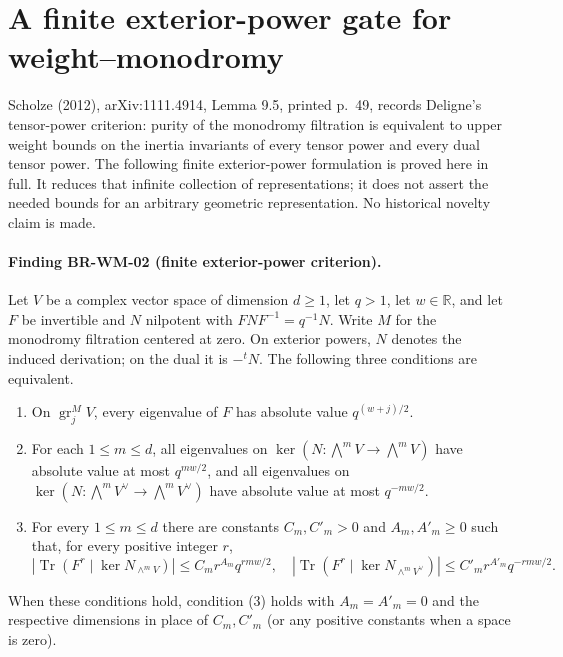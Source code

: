 \section{A finite exterior-power gate for weight--monodromy}
\label{sec:finite-weight-gate}

Scholze (2012), arXiv:1111.4914, Lemma 9.5, printed p.~49,
records Deligne's tensor-power criterion: purity of the monodromy
filtration is equivalent to upper weight bounds on the inertia
invariants of every tensor power and every dual tensor power.
The following finite exterior-power formulation is proved here in
full. It reduces that infinite collection of representations; it
does not assert the needed bounds for an arbitrary geometric
representation. No historical novelty claim is made.

\paragraph{Finding BR-WM-02 (finite exterior-power criterion).}
Let $V$ be a complex vector space of dimension $d\geq1$, let
$q>1$, let $w\in\mathbb R$, and let $F$ be invertible and $N$
nilpotent with $FNF^{-1}=q^{-1}N$. Write $M$ for the monodromy
filtration centered at zero. On exterior powers, $N$ denotes the
induced derivation; on the dual it is $-{}^tN$. The following
three conditions are equivalent.
\begin{enumerate}
\item On $\operatorname{gr}_j^M V$, every eigenvalue of $F$
has absolute value $q^{(w+j)/2}$.
\item For each $1\leq m\leq d$, all eigenvalues on
$\ker(N:\bigwedge^m V\to\bigwedge^m V)$ have absolute value
at most $q^{mw/2}$, and all eigenvalues on
$\ker(N:\bigwedge^m V^\vee\to\bigwedge^m V^\vee)$ have absolute
value at most $q^{-mw/2}$.
\item For every $1\leq m\leq d$ there are constants
$C_m,C'_m>0$ and $A_m,A'_m\geq0$ such that, for every
positive integer $r$,
\[
 \left|\operatorname{Tr}\left(F^r\mid
             \ker N_{\wedge^m V}\right)\right|
       \leq C_m r^{A_m}q^{rmw/2},
 \quad
 \left|\operatorname{Tr}\left(F^r\mid
             \ker N_{\wedge^m V^\vee}\right)\right|
       \leq C'_m r^{A'_m}q^{-rmw/2}.
\]
\end{enumerate}
When these conditions hold, condition (3) holds with $A_m=A'_m=0$
and the respective dimensions in place of $C_m,C'_m$ (or any
positive constants when a space is zero).

